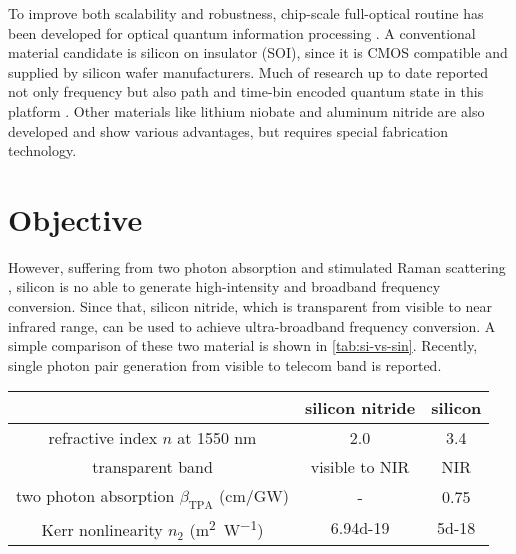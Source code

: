 To improve both scalability and robustness, chip-scale full-optical routine has been developed for optical quantum information processing \cites{ Vahala2008, OBrien2009}.  
A conventional material candidate is silicon on insulator (SOI), since it is CMOS compatible and supplied by silicon wafer manufacturers. Much of research up to date reported not only frequency \cite{Kues2017b} but also path and time-bin encoded quantum state in this platform \cites{Paesani2018,Zhang2018a}. Other materials like lithium niobate and aluminum nitride are also developed and show various advantages, but requires special fabrication technology.

\section{Objective}

However, suffering from two photon absorption and stimulated Raman scattering \cite{Engin2012}, silicon is no able to generate high-intensity and broadband frequency conversion. 
Since that, silicon nitride, which is transparent from visible to near infrared range, can be used to achieve ultra-broadband frequency conversion. 
A simple comparison of these two material is shown in \autoref{tab:si-vs-sin}.
Recently, single photon pair generation from visible to telecom band is reported\cite{Lu2016}. 

\begin{table}[]
	\label{tab:si-vs-sin}
	\begin{tabular}{ccc}
							& silicon nitride 			& silicon		 			\\ \hline
		refractive index $n$ at 1550 nm
							& 2.0						& 3.4						\\ \hline
		transparent band 	& visible to NIR			& NIR					    \\ \hline
		two photon absorption $ \beta_\mathrm{TPA} $ (cm/GW)                 
							& - 						& 0.75 			 			\\ \hline
		Kerr nonlinearity $ n_2 $ (\si{\square\meter\per\watt})             
							& \num{6.94d-19} 			& \num{5d-18} 				\\ \hline
	\end{tabular}
\end{table}

